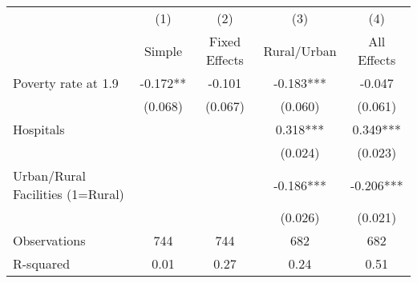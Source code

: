 {
\def\sym#1{\ifmmode^{#1}\else\(^{#1}\)\fi}
\begin{tabular}{l*{4}{c}}
\hline\hline
                    &\multicolumn{1}{c}{(1)}&\multicolumn{1}{c}{(2)}&\multicolumn{1}{c}{(3)}&\multicolumn{1}{c}{(4)}\\
                    &\multicolumn{1}{c}{Simple}&\multicolumn{1}{c}{Fixed Effects}&\multicolumn{1}{c}{Rural/Urban}&\multicolumn{1}{c}{All Effects}\\
\hline
Poverty rate at 1.9 &      -0.172** &      -0.101   &      -0.183***&      -0.047   \\
                    &     (0.068)   &     (0.067)   &     (0.060)   &     (0.061)   \\
Hospitals           &               &               &       0.318***&       0.349***\\
                    &               &               &     (0.024)   &     (0.023)   \\
Urban/Rural Facilities (1=Rural)&               &               &      -0.186***&      -0.206***\\
                    &               &               &     (0.026)   &     (0.021)   \\
\hline
Observations        &         744   &         744   &         682   &         682   \\
R-squared           &        0.01   &        0.27   &        0.24   &        0.51   \\
\hline\hline
\end{tabular}
}
